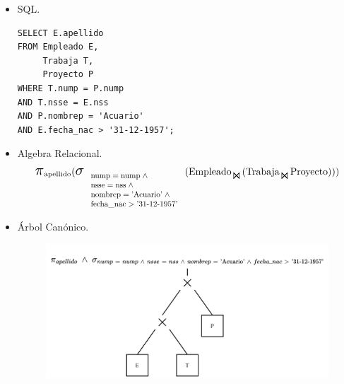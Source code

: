 \documentclass{templateNote}
\begin{document}
\begin{itemize}
    \item SQL.
    \begin{verbatim}
SELECT E.apellido
FROM Empleado E,
     Trabaja T,
     Proyecto P
WHERE T.nump = P.nump
AND T.nsse = E.nss
AND P.nombrep = 'Acuario'
AND E.fecha_nac > '31-12-1957';
    \end{verbatim}

    \item Algebra Relacional.
    \begin{align*}
        \scalebox{1.5}{$\pi$}_{\text{apellido}} (
            \scalebox{1.5}{$\sigma$}_{
                \scalebox{0.8}{
                    $\begin{array}{l}
                        \text{nump} = \text{nump} \; \wedge \\
                        \text{nsse} = \text{nss} \; \wedge \\
                        \text{nombrep} = \text{'Acuario'} \; \wedge \\
                        \text{fecha\_nac} > \text{'31-12-1957'}
                    \end{array}$
                }
            } (
                \text{Empleado}_{\scalebox{1.3}{$\Join$}} (
                    \text{Trabaja}_{\scalebox{1.3}{$\Join$}} \text{Proyecto}
                )
            )
        )
    \end{align*}

    \newpage
    \item \'Arbol Can\'onico.
    \begin{figure}[H]
        \centering
        \includegraphics[width=\textwidth]{img/E5-Canonico.png}
    \end{figure}


\end{itemize}
\end{document}
